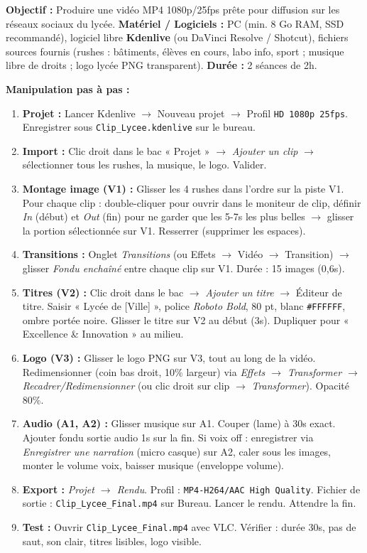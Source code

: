 \documentclass[11pt]{article}
\begin{document}
\begin{experience}
\textbf{Objectif :} Produire une vidéo MP4 1080p/25fps prête pour diffusion sur les réseaux sociaux du lycée.
\textbf{Matériel / Logiciels :} PC (min. 8 Go RAM, SSD recommandé), logiciel libre \textbf{Kdenlive} (ou DaVinci Resolve / Shotcut), fichiers sources fournis (rushes : bâtiments, élèves en cours, labo info, sport ; musique libre de droits ; logo lycée PNG transparent).
\textbf{Durée :} 2 séances de 2h.

\textbf{Manipulation pas à pas :}
\begin{enumerate}
  \item \textbf{Projet :} Lancer Kdenlive $\to$ Nouveau projet $\to$ Profil \texttt{HD 1080p 25fps}. Enregistrer sous \texttt{Clip\_Lycee.kdenlive} sur le bureau.
  \item \textbf{Import :} Clic droit dans le bac « Projet » $\to$ \emph{Ajouter un clip} $\to$ sélectionner tous les rushes, la musique, le logo. Valider.
  \item \textbf{Montage image (V1) :} Glisser les 4 rushes dans l'ordre sur la piste V1. Pour chaque clip : double-cliquer pour ouvrir dans le moniteur de clip, définir \emph{In} (début) et \emph{Out} (fin) pour ne garder que les 5-7s les plus belles $\to$ glisser la portion sélectionnée sur V1. Resserrer (supprimer les espaces).
  \item \textbf{Transitions :} Onglet \emph{Transitions} (ou Effets $\to$ Vidéo $\to$ Transition) $\to$ glisser \emph{Fondu enchaîné} entre chaque clip sur V1. Durée : 15 images (0,6s).
  \item \textbf{Titres (V2) :} Clic droit dans le bac $\to$ \emph{Ajouter un titre} $\to$ Éditeur de titre. Saisir « Lycée de [Ville] », police \emph{Roboto Bold}, 80 pt, blanc \texttt{\#FFFFFF}, ombre portée noire. Glisser le titre sur V2 au début (3s). Dupliquer pour « Excellence \& Innovation » au milieu.
  \item \textbf{Logo (V3) :} Glisser le logo PNG sur V3, tout au long de la vidéo. Redimensionner (coin bas droit, 10\% largeur) via \emph{Effets $\to$ Transformer $\to$ Recadrer/Redimensionner} (ou clic droit sur clip $\to$ \emph{Transformer}). Opacité 80\%.
  \item \textbf{Audio (A1, A2) :} Glisser musique sur A1. Couper (lame) à 30s exact. Ajouter fondu sortie audio 1s sur la fin. Si voix off : enregistrer via \emph{Enregistrer une narration} (micro casque) sur A2, caler sous les images, monter le volume voix, baisser musique (enveloppe volume).
  \item \textbf{Export :} \emph{Projet $\to$ Rendu}. Profil : \texttt{MP4-H264/AAC High Quality}. Fichier de sortie : \texttt{Clip\_Lycee\_Final.mp4} sur Bureau. Lancer le rendu. Attendre la fin.
  \item \textbf{Test :} Ouvrir \texttt{Clip\_Lycee\_Final.mp4} avec VLC. Vérifier : durée 30s, pas de saut, son clair, titres lisibles, logo visible.
\end{enumerate}


\end{experience}
\end{document}

